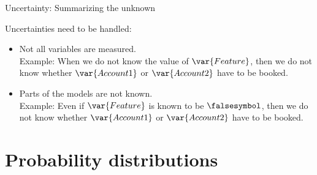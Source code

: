 \documentclass{beamer}
\begin{document}
    \begin{frame}{Uncertainty: Summarizing the unknown}

        Uncertainties need to be handled:
        \begin{itemize}
            \item Not all variables are measured. \\
            Example: When we do not know the value of $\var{Feature}$, then we do not know whether $\var{Account 1}$ or $\var{Account 2}$ have to be booked.
            \item Parts of the models are not known. \\
            Example: Even if $\var{Feature}$ is known to be $\falsesymbol$, then we do not know whether $\var{Account 1}$ or $\var{Account 2}$ have to be booked.
        \end{itemize}



    \end{frame}

%
%
%
%


    \section{Probability distributions}


%
%
\end{document}
